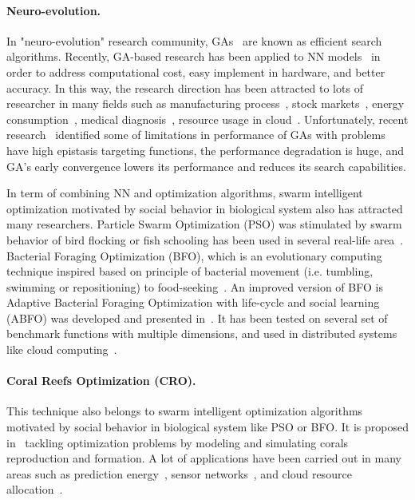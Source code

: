 \documentclass[smallcondensed, natbib]{svjour3}     %
\begin{document}
\paragraph{Neuro-evolution.} In "neuro-evolution" research community, GAs~\citep{ref_holland} are known as efficient search algorithms. Recently, GA-based research has been applied to NN models~\citep{ref_montana, ref_whitley} in order to address computational cost, easy implement in hardware, and better accuracy. In this way, the research direction has been attracted to lots of researcher in many fields such as manufacturing process~\citep{ref_cook}, stock markets~\citep{ref_kim}, energy consumption~\citep{ref_magnier}, medical diagnosis~\citep{ref_karegowda}, resource usage in cloud~\citep{ref_thieu}. Unfortunately, recent research~\citep{ref_ramesh} identified some of limitations in performance of GAs with problems have high epistasis targeting functions, the performance degradation is huge, and GA's early convergence lowers its performance and reduces its search capabilities. 

In term of combining NN and optimization algorithms, swarm intelligent optimization motivated by social behavior in biological system also has attracted many researchers. Particle Swarm Optimization (PSO) was stimulated by swarm behavior of bird flocking or fish schooling has been used in several real-life area~\citep{ref_kennedy2011}. Bacterial Foraging Optimization (BFO), which is an evolutionary computing technique inspired based on principle of bacterial movement (i.e. tumbling, swimming or repositioning) to food-seeking~\citep{ref_passino2002}. An improved version of BFO is Adaptive Bacterial Foraging Optimization with life-cycle and social learning (ABFO) was developed and presented in~\citep{ref_yan2012}. It has been tested on several set of benchmark functions with multiple dimensions, and used in distributed systems like cloud computing~\citep{ref_thieu2}.

\paragraph{Coral Reefs Optimization (CRO).} This technique also belongs to swarm intelligent optimization algorithms motivated by social behavior in biological system like PSO or BFO. It is proposed in~\citep{ref_salcedo_sanz1} tackling optimization problems by modeling and simulating corals reproduction and formation. A lot of applications have been carried out in many areas such as prediction energy~\citep{ref_salcedo_sanz2, ref_salcedo_sanz4}, sensor networks~\citep{ref_li}, and cloud resource allocation~\citep{ref_ficco}. 
\end{document}
